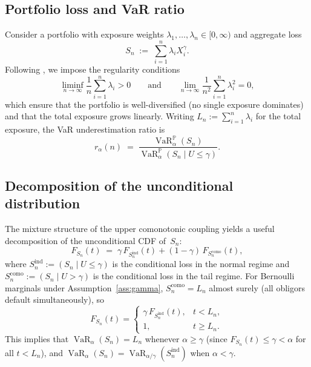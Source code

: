 \documentclass[11pt]{article}
\theoremstyle{definition}
\newcommand{\VaR}{\operatorname{VaR}}
\newcommand{\PP}{\mathbb{P}}
\newcommand{\1}{\mathbf{1}}
\begin{document}
\subsection{Portfolio loss and VaR ratio}

Consider a portfolio with exposure weights $\lambda_1, \ldots, \lambda_n \in [0, \infty)$ and aggregate loss
\begin{equation}\label{eq:portfolio_loss}
  S_n \;:=\; \sum_{i=1}^n \lambda_i X_i^\gamma.
\end{equation}
Following \citet{DVNSupper}, we impose the regularity conditions
\begin{equation}\label{eq:weight_cond}
  \liminf_{n \to \infty} \frac{1}{n}\sum_{i=1}^n \lambda_i > 0
  \qquad\text{and}\qquad
  \lim_{n \to \infty} \frac{1}{n^2}\sum_{i=1}^n \lambda_i^2 = 0,
\end{equation}
which ensure that the portfolio is well-diversified (no single exposure dominates) and that the total exposure grows linearly. Writing $L_n := \sum_{i=1}^n \lambda_i$ for the total exposure, the VaR underestimation ratio is
\begin{equation}\label{eq:ratio}
  r_\alpha(n) \;=\; \frac{\VaR_\alpha^\PP(S_n)}{\VaR_\alpha^\PP(S_n \mid U \leq \gamma)}.
\end{equation}

\subsection{Decomposition of the unconditional distribution}\label{sec:decomposition}

The mixture structure of the upper comonotonic coupling yields a useful decomposition of the unconditional CDF of~$S_n$:
\begin{equation}\label{eq:mixture_cdf}
  F_{S_n}(t) \;=\; \gamma\,F_{S_n^{\mathrm{ind}}}(t) + (1-\gamma)\,F_{S_n^{\mathrm{como}}}(t),
\end{equation}
where $S_n^{\mathrm{ind}} := (S_n \mid U \leq \gamma)$ is the conditional loss in the normal regime and $S_n^{\mathrm{como}} := (S_n \mid U > \gamma)$ is the conditional loss in the tail regime. For Bernoulli marginals under Assumption~\ref{ass:gamma}, $S_n^{\mathrm{como}} = L_n$ almost surely (all obligors default simultaneously), so
\begin{equation}\label{eq:bern_mixture}
  F_{S_n}(t) = \begin{cases}
    \gamma\,F_{S_n^{\mathrm{ind}}}(t), & t < L_n, \\
    1, & t \geq L_n.
  \end{cases}
\end{equation}
This implies that $\VaR_\alpha(S_n) = L_n$ whenever $\alpha \geq \gamma$ (since $F_{S_n}(t) \leq \gamma < \alpha$ for all $t < L_n$), and $\VaR_\alpha(S_n) = \VaR_{\alpha/\gamma}(S_n^{\mathrm{ind}})$ when $\alpha < \gamma$.
\end{document}
